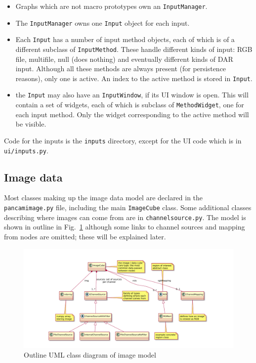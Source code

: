 \begin{itemize}
\item Graphs which are not macro prototypes own an \texttt{InputManager}.
\item The \texttt{InputManager} owns one \texttt{Input} object for each input.
\item Each \texttt{Input} has a number of input method objects,
each of which is of a different subclass of \texttt{InputMethod}.
These handle different kinds of input: RGB file, multifile, null (does nothing)
and eventually different kinds of DAR input. Although all these methods are
always present (for persistence reasons), only one is active. An index
to the active method is stored in \texttt{Input}.
\item the \texttt{Input} may also have an \texttt{InputWindow}, if its
UI window is open. This will contain a set of widgets, each of which is
subclass of \texttt{MethodWidget}, one for each input method. Only the widget
corresponding to the active method will be visible.
\end{itemize}
Code for the inputs is the \texttt{inputs} directory, except for the UI
code which is in \texttt{ui/inputs.py}.


\clearpage
\subsection{Image data}
Most classes making up the image data 
model are declared in the \texttt{pancamimage.py} file, including the main \texttt{ImageCube}
class. Some additional classes describing where images can come from are in \texttt{channelsource.py}.
The model is shown in outline in Fig.~\ref{image.pdf} although some links to channel sources
and mapping from nodes are omitted; these will be explained later.

\begin{figure}[ht]
\center
\includegraphics[width=7in]{image.pdf}
\caption{Outline UML class diagram of image model}
\label{image.pdf}
\end{figure}

